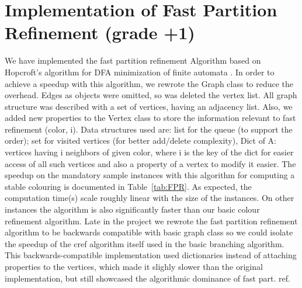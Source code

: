 \documentclass[twoside]{article}
\begin{document}
\section{Implementation of Fast Partition Refinement (grade +1)}
We have implemented the fast partition refinement Algorithm based on Hopcroft's algorithm for DFA minimization of finite automata \cite{Hop1971}.
In order to achieve a speedup with this algorithm, we rewrote the Graph class to reduce the overhead. Edges as objects were omitted, so was deleted the vertex list. All graph structure was described with a set of vertices, having an adjacency list. Also, we added new properties to the Vertex class to store the information relevant to fast refinement (color, i). Data structures used are: list for the queue (to support the order); set for visited vertices (for better add/delete complexity), Dict of A: vertices having i neighbors of given color, where i is the key of the dict for easier access of all such vertices and also a property of a vertex to modify it easier.
The speedup on the mandatory sample instances with
this algorithm for computing a stable colouring is documented in
Table~\ref{tab:FPR}.
As expected, the computation time(s) scale roughly linear with the size of the instances. On other instances the
algorithm is also significantly faster than our basic colour refinement algorithm.
Late in the project we rewrote the fast partition refinement algorithm to be backwards compatible with basic graph class so we could isolate the speedup of the cref algorithm itself used in the basic branching algorithm.
This backwards-compatible implementation used dictionaries instead of attaching properties to the vertices, which made it slighly slower than the original implementation, but still showcased the algorithmic dominance of fast part. ref.
\end{document}
